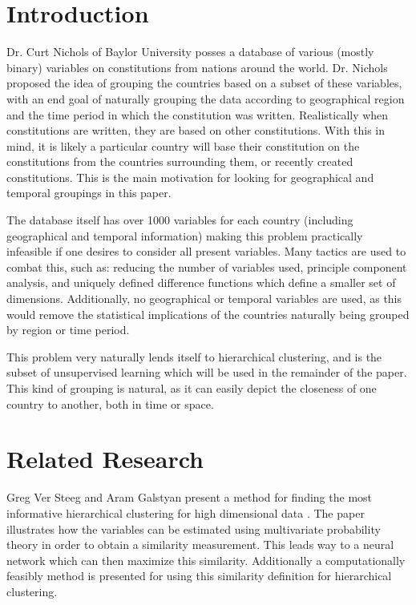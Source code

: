 \documentclass{article}
\begin{document}
\section{Introduction}
Dr. Curt Nichols of Baylor University posses a database of various (mostly binary) variables on constitutions from nations around the world. Dr. Nichols proposed the idea of grouping the countries based on a subset of these variables, with an end goal of naturally grouping the data according to geographical region and the time period in which the constitution was written. Realistically when constitutions are written, they are based on other constitutions. With this in mind, it is likely a particular country will base their constitution on the constitutions from the countries surrounding them, or recently created constitutions. This is the main motivation for looking for geographical and temporal groupings in this paper.

The database itself has over 1000 variables for each country (including geographical and temporal information) making this problem practically infeasible if one desires to consider all present variables. Many tactics are used to combat this, such as: reducing the number of variables used, principle component analysis, and uniquely defined difference functions which define a smaller set of dimensions. Additionally, no geographical or temporal variables are used, as this would remove the statistical implications of the countries naturally being grouped by region or time period.

This problem very naturally lends itself to hierarchical clustering, and is the subset of unsupervised learning which will be used in the remainder of the paper. This kind of grouping is natural, as it can easily depict the closeness of one country to another, both in time or space. 

\section{Related Research}
Greg Ver Steeg and Aram Galstyan present a method for finding the most informative hierarchical clustering for high dimensional data \cite{HD-Clustering}. The paper illustrates how the variables can be estimated using multivariate probability theory in order to obtain a similarity measurement. This leads way to a neural network which can then maximize this similarity. Additionally a computationally feasibly method is presented for using this similarity definition for hierarchical clustering. 
\end{document}

